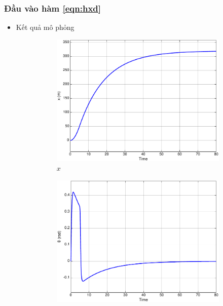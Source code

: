 \documentclass[12pt,a4paper]{article}
\begin{document}
\subsubsection{Đầu vào hàm \eqref{eqn:hxd}}
\begin{itemize}
    \item Kết quả mô phỏng 
    \begin{figure}[ht]
        \centering
        \begin{subfigure}[b]{0.495\linewidth}
            \centering
            \includegraphics[width=\linewidth]{phan_tich_x_f.pdf}
            \caption{$x$}
        \end{subfigure}\hfill
        \begin{subfigure}[b]{0.495\linewidth}
            \centering
            \includegraphics[width=\linewidth]{phan_tich_theta_f.pdf}

\end{subfigure}
\end{figure}
\end{itemize}
\end{document}
